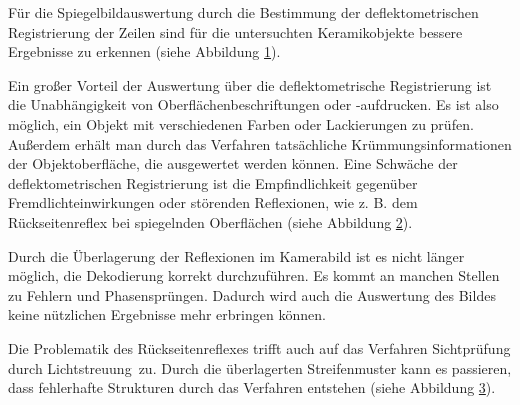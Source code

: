 \p
Für die Spiegelbildauswertung durch die Bestimmung der deflektometrischen Registrierung der Zeilen sind für die untersuchten Keramikobjekte bessere Ergebnisse zu erkennen (siehe Abbildung \ref{tikz:abbErkennbareDefekteRegistrierung}).

{
	\begin{figure}[H]
		\centering
		
		\label{tikz:abbErkennbareDefekteRegistrierung}
	\end{figure}
}

\noindent
Ein großer Vorteil der Auswertung über die deflektometrische Registrierung ist die Unabhängigkeit von Oberflächenbeschriftungen oder -aufdrucken.
Es ist also möglich, ein Objekt mit verschiedenen Farben oder Lackierungen zu prüfen.
Außerdem erhält man durch das Verfahren tatsächliche Krümmungsinformationen der Objektoberfläche, die ausgewertet werden können.
Eine Schwäche der deflektometrischen Registrierung ist die Empfindlichkeit gegenüber Fremdlichteinwirkungen oder störenden Reflexionen, wie z. B. dem Rückseitenreflex bei spiegelnden Oberflächen (siehe Abbildung \ref{tikz:abbRückseitenreflexRegistrierung}).

{
	\begin{figure}[H]
		\centering
		
		\label{tikz:abbRückseitenreflexRegistrierung}
	\end{figure}
}

\noindent
Durch die Überlagerung der Reflexionen im Kamerabild ist es nicht länger möglich, die Dekodierung korrekt durchzuführen.
Es kommt an manchen Stellen zu Fehlern und Phasensprüngen.
Dadurch wird auch die Auswertung des Bildes keine nützlichen Ergebnisse mehr erbringen können.

\p
Die Problematik des Rückseitenreflexes trifft auch auf das Verfahren \glqq Sichtprüfung durch Lichtstreuung\grqq ~zu.
Durch die überlagerten Streifenmuster kann es passieren, dass fehlerhafte Strukturen durch das Verfahren entstehen (siehe Abbildung \ref{tikz:abbRückseitenreflexLichtstreuung}).

{
	\begin{figure}[H]
		\centering
		
		\label{tikz:abbRückseitenreflexLichtstreuung}
	\end{figure}
}

